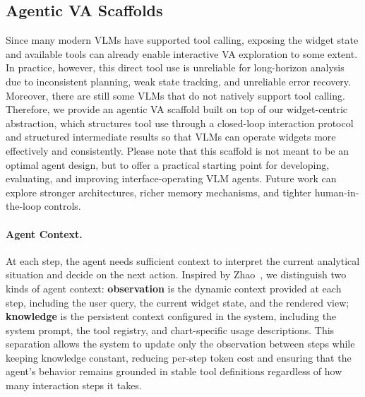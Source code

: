 \subsection{Agentic VA Scaffolds}
\noindent Since many modern VLMs have supported tool calling, exposing the widget state and available tools can already enable interactive VA exploration to some extent.
In practice, however, this direct tool use is unreliable for long-horizon analysis due to inconsistent planning, weak state tracking, and unreliable error recovery.
Moreover, there are still some VLMs that do not natively support tool calling.
Therefore, we provide an agentic VA scaffold built on top of our widget-centric abstraction, which structures tool use through a closed-loop interaction protocol and structured intermediate results so that VLMs can operate widgets more effectively and consistently.
Please note that this scaffold is not meant to be an optimal agent design, but to offer a practical starting point for developing, evaluating, and improving interface-operating VLM agents.
Future work can explore stronger architectures, richer memory mechanisms, and tighter human-in-the-loop controls.
\label{sec:framework_grounding}
\paragraph{Agent Context.}
At each step, the agent needs sufficient context to interpret the current analytical situation and decide on the next action.
Inspired by Zhao~\etal\cite{Zhao2025ProactiveVA}, we distinguish two kinds of agent context: \textbf{observation} is the dynamic context provided at each step, including the user query, the current widget state, and the rendered view; \textbf{knowledge} is the persistent context configured in the system, including the system prompt, the tool registry, and chart-specific usage descriptions. This separation allows the system to update only the observation between steps while keeping knowledge constant, reducing per-step token cost and ensuring that the agent's behavior remains grounded in stable tool definitions regardless of how many interaction steps it takes.




